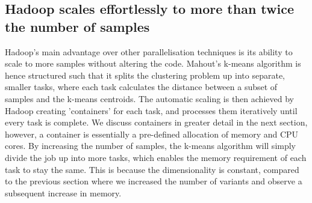 \documentclass{bioinfo}
\begin{document}
\subsection*{Hadoop scales effortlessly to more than twice the number of samples}

Hadoop's main advantage over other parallelisation techniques is its ability to scale to more samples without altering the code. 
Mahout's k-means algorithm is hence structured such that it splits the clustering problem up into separate, smaller tasks, where each task calculates the distance between a subset of samples and the k-means centroids. 
The automatic scaling is then achieved by Hadoop creating 'containers' for each task, and processes them iteratively until every task is complete.
We discuss containers in greater detail in the next section, however, a container is essentially a pre-defined allocation of memory and CPU cores.
By increasing the number of samples, the k-means algorithm will simply divide the job up into more tasks, which enables the memory requirement of each task to stay the same. 
This is because the dimensionality is constant, compared to the previous section where we increased the number of variants and observe a subsequent increase in memory. 
\end{document}

